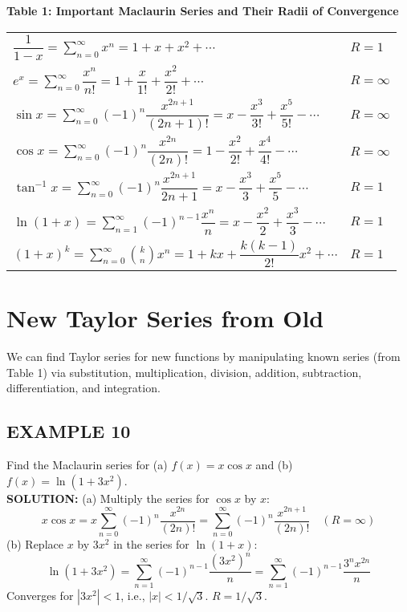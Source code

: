 \documentclass{article}
\theoremstyle{mystyle}
\begin{document}
\begin{center}
\textbf{Table 1: Important Maclaurin Series and Their Radii of Convergence}
\begin{tabular}{|l|l|}
\hline
\( \dfrac{1}{1-x} = \sum_{n=0}^{\infty} x^n = 1 + x + x^2 + \cdots \) & \( R=1 \) \\
\( e^x = \sum_{n=0}^{\infty} \dfrac{x^n}{n!} = 1 + \dfrac{x}{1!} + \dfrac{x^2}{2!} + \cdots \) & \( R=\infty \) \\
\( \sin x = \sum_{n=0}^{\infty} (-1)^n \dfrac{x^{2n+1}}{(2n+1)!} = x - \dfrac{x^3}{3!} + \dfrac{x^5}{5!} - \cdots \) & \( R=\infty \) \\
\( \cos x = \sum_{n=0}^{\infty} (-1)^n \dfrac{x^{2n}}{(2n)!} = 1 - \dfrac{x^2}{2!} + \dfrac{x^4}{4!} - \cdots \) & \( R=\infty \) \\
\( \tan^{-1} x = \sum_{n=0}^{\infty} (-1)^n \dfrac{x^{2n+1}}{2n+1} = x - \dfrac{x^3}{3} + \dfrac{x^5}{5} - \cdots \) & \( R=1 \) \\
\( \ln(1+x) = \sum_{n=1}^{\infty} (-1)^{n-1} \dfrac{x^n}{n} = x - \dfrac{x^2}{2} + \dfrac{x^3}{3} - \cdots \) & \( R=1 \) \\
\( (1+x)^k = \sum_{n=0}^{\infty} \binom{k}{n} x^n = 1 + kx + \dfrac{k(k-1)}{2!}x^2 + \cdots \) & \( R=1 \) \\
\hline
\end{tabular}
\end{center}

\section*{New Taylor Series from Old}
We can find Taylor series for new functions by manipulating known series (from Table 1) via substitution, multiplication, division, addition, subtraction, differentiation, and integration.

\subsection*{EXAMPLE 10}
Find the Maclaurin series for (a) \(f(x) = x \cos x\) and (b) \(f(x) = \ln(1+3x^2)\).\\
\textbf{SOLUTION:}
(a) Multiply the series for \(\cos x\) by \(x\):
\[ x \cos x = x \sum_{n=0}^{\infty} (-1)^n \dfrac{x^{2n}}{(2n)!} = \sum_{n=0}^{\infty} (-1)^n \dfrac{x^{2n+1}}{(2n)!} \quad (R=\infty) \]
(b) Replace \(x\) by \(3x^2\) in the series for \(\ln(1+x)\):
\[ \ln(1+3x^2) = \sum_{n=1}^{\infty} (-1)^{n-1} \dfrac{(3x^2)^n}{n} = \sum_{n=1}^{\infty} (-1)^{n-1} \dfrac{3^n x^{2n}}{n} \]
Converges for \(|3x^2| < 1\), i.e., \(|x| < 1/\sqrt{3}\). \(R=1/\sqrt{3}\).
\end{document}
